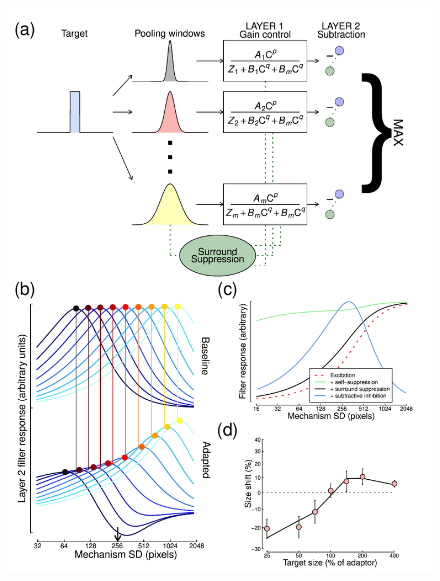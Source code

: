 \documentclass[
]{article}
\begin{document}
\begin{figure}

{\centering \includegraphics[width=0.7\linewidth]{Figures/Figure5} 

}


\end{figure}
\end{document}
